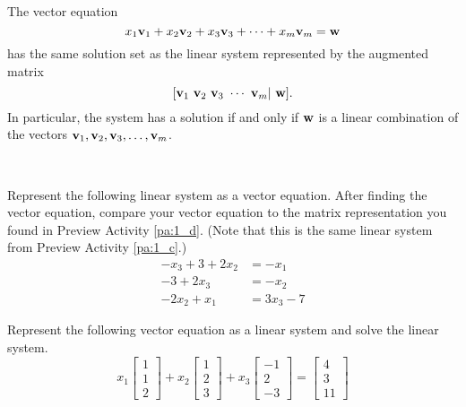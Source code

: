 \begin{theorem}
The vector equation
\[x_1 \mathbf{v}_1 + x_2\mathbf{v}_2 + x_3\mathbf{v}_3 + \cdots + x_m\mathbf{v}_m = \mathbf{w}\]
has the same solution set as the linear system represented by the augmented matrix
\[[\vv_1 \  \vv_2 \  \vv_3 \ \cdots \ \vv_m | \ \vw].\]
In particular, the system has a solution if and only if $\mathbf{w}$ is a linear combination of the vectors $\mathbf{v}_1, \mathbf{v}_2, \mathbf{v}_3, \ldots, \mathbf{v}_m$.
\end{theorem}

\begin{activity} \label{act:A1.3_8} ~
	\ba
	\item Represent the following linear system as a vector equation. After finding the vector equation, compare your vector equation to the matrix representation you found in Preview Activity \ref{pa:1_d}. (Note that this is the same linear system from Preview Activity \ref{pa:1_c}.) 
\begin{equation*}
\begin{split}
-x_3 + 3 + 2x_2&= -x_1   \\
-3 + 2x_3 &= -x_2  \\
-2x_2 + x_1 &= 3x_3-7 
\end{split} 
\end{equation*} 


	\item Represent the following vector equation as a linear system and solve the linear system.
\[x_1 \left[ \begin{array}{c} 1 \\ 1 \\ 2 \end{array} \right] +x_2 \left[ \begin{array}{c} 1 \\ 2\\ 3 \end{array} \right] + x_3 \left[ \begin{array}{r} -1 \\ 2 \\ -3 \end{array} \right] = \left[ \begin{array}{c} 4 \\ 3\\ 11 \end{array} \right] \]

	\ea
\end{activity}


\label{sec:vec_span}

